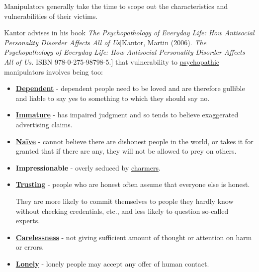 \documentclass{book}
\numberwithin{equation}{section}
\begin{document}
Manipulators generally take the time to scope out the characteristics and vulnerabilities of their victims.

%
Kantor advises in his book \textit{The Psychopathology of Everyday Life: How Antisocial Personality Disorder Affects All of Us}[Kantor, Martin (2006). \textit{The Psychopathology of Everyday Life: How Antisocial Personality Disorder Affects All of Us.} ISBN 978-0-275-98798-5.] that vulnerability to \href{https://en.wikipedia.org/wiki/Psychopathic}{psychopathic} manipulators involves being too: 
\begin{itemize}
    \item \href{https://en.wikipedia.org/wiki/Dependent_personality_disorder}{\textbf{Dependent}} - dependent people need to be loved and are therefore gullible and liable to say yes to something to which they should say no.
    \item \href{https://en.wikipedia.org/wiki/Maturity_(psychological)}{\textbf{Immature}} - has impaired judgment and so tends to believe exaggerated advertising claims.
    \item \href{https://en.wikipedia.org/wiki/Na%C3%AFve}{\textbf{Naïve}} - cannot believe there are dishonest people in the world, or takes it for granted that if there are any, they will not be allowed to prey on others.
    \item \textbf{Impressionable} - overly seduced by \href{https://en.wikipedia.org/wiki/Superficial_charm}{charmers}.
    \item \href{https://en.wikipedia.org/wiki/Trusting}{\textbf{Trusting}} - people who are honest often assume that everyone else is honest.
    
    They are more likely to commit themselves to people they hardly know without checking credentials, etc., and less likely to question so-called experts.
    \item \href{https://en.wikipedia.org/wiki/Carelessness}{\textbf{Carelessness}} - not giving sufficient amount of thought or attention on harm or errors.
    \item \href{https://en.wikipedia.org/wiki/Loneliness}{\textbf{Lonely}} - lonely people may accept any offer of human contact.
    

\end{itemize}
\end{document}
